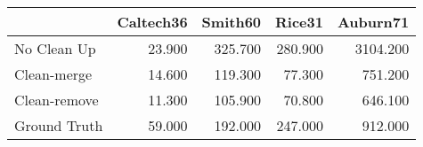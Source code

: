\begin{tabular}{lrrrr}
\toprule
{} & Caltech36 & Smith60 &  Rice31 & Auburn71 \\
\midrule
No Clean Up  &    23.900 & 325.700 & 280.900 & 3104.200 \\
Clean-merge  &    14.600 & 119.300 &  77.300 &  751.200 \\
Clean-remove &    11.300 & 105.900 &  70.800 &  646.100 \\
Ground Truth &    59.000 & 192.000 & 247.000 &  912.000 \\
\bottomrule
\end{tabular}
